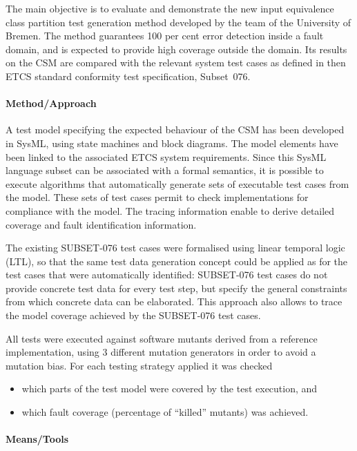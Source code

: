 The main objective is to evaluate and demonstrate the new input
equivalence class partition test generation method developed by the
team of the University of Bremen. The method guarantees 100 per cent
error detection inside a fault domain, and is expected to provide high
coverage outside the domain. Its results on the CSM are compared with the
relevant system test cases as defined in then ETCS standard conformity
test specification, Subset~076.


\paragraph{Method/Approach}

A test model specifying the expected behaviour of the CSM has been
developed in SysML, using state machines and block diagrams.  The
model elements have been linked to the associated ETCS system
requirements.  Since this SysML language subset can be associated with
a formal semantics, it is possible to execute algorithms that
automatically generate sets of executable test cases from the
model. These sets of test cases permit to check implementations for
compliance with the model. The tracing information enable to derive
detailed coverage and fault identification information.

The existing SUBSET-076 test cases were formalised using linear
temporal logic (LTL), so that the same test data generation concept
could be applied as for the test cases that were automatically
identified: SUBSET-076 test cases do not provide concrete test data
for every test step, but specify the general constraints from which
concrete data can be elaborated.  This approach also allows to trace
the model coverage achieved by the SUBSET-076 test cases.

All tests were executed against software mutants derived from a
reference implementation, using 3 different mutation generators in
order to avoid a mutation bias. For each testing strategy applied it
was checked
\begin{itemize}
\item which parts of the test model were covered by the test execution, and
\item which fault coverage (percentage of ``killed'' mutants) was achieved.
\end{itemize}





\paragraph{Means/Tools}

